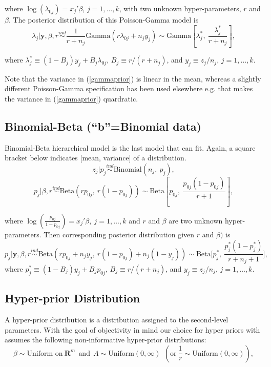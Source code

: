 \documentclass[article]{jss}
\begin{document}
where $\log(\lambda_{0j}) =x_{j}'\beta$, $j=1, \ldots, k$, with two unknown hyper-parameters, $r$ and $\beta$. The posterior distribution of this Poisson-Gamma model is
\begin{equation} \label{gammapost}
\lambda_{j}\vert \textbf{y}, \beta, r \stackrel{ind}{\sim}\frac{1}{r + n_{j}}\textrm{Gamma}(r\lambda_{0j} + n_{j}y_{j})\sim\textrm{Gamma} \left[\lambda^{\ast}_{j},~\frac{\lambda^{\ast}_{j}}{r+n_{j}} \right],
\end{equation}

where $\lambda^{\ast}_{j} \equiv (1-B_{j})y_{j} + B_{j}\lambda_{0j}$,  $B_{j}\equiv r / (r+n_{j})$, and $y_{j}\equiv z_{j} / n_{j}$, $j=1, \ldots, k$. 


Note that the variance in (\ref{gammaprior}) is linear in the mean, whereas a slightly different Poisson-Gamma specification \citep{1997} has been used elsewhere e.g. that makes the variance in (\ref{gammaprior}) quardratic.

\subsection[Binomial-Beta]{Binomial-Beta (``b''=Binomial data)}
Binomial-Beta hierarchical model is the last model that  can fit. Again, a square bracket below indicates [mean, variance] of a distribution.
\begin{equation}
z_{j} \vert p_{j}\stackrel{ind}{\sim}\textrm{Binomial}(n_{j}, ~p_{j}),
\end{equation}
\begin{equation}
p_{j} \vert \beta, r\stackrel{ind}{\sim}\textrm{Beta}(rp_{0j},~ r(1-p_{0j}))\sim \textrm{Beta} \left[p_{0j}, ~\frac{p_{0j}(1-p_{0j})}{r + 1} \right],
\end{equation}

where $\log(\frac{p_{0j}}{1-p_{0j}}) =x_{j}'\beta, ~j=1, \ldots, k$ and $r$ and $\beta$ are two unknown hyper-parameters. Then corresponding posterior distribution given  $r$ and $\beta)$ is
\begin{equation} \label{betapost}
p_{j}\vert \textbf{y}, \beta, r \stackrel{ind}{\sim}\textrm{Beta}(rp_{0j}+n_{j}y_{j},~r(1-p_{0j})+n_{j}(1-y_{j}))\sim\textrm{Beta}\bigg[p^{\ast}_{j},~ \frac{p^{\ast}_{j}(1-p^{\ast}_{j})}{r+n_{j}+1}\bigg],
\end{equation}
where $p^{\ast}_{j}\equiv(1-B_{j})y_{j}+B_{j}p_{0j}$, $B_{j}\equiv r/ (r+n_{j})$, and $y_{j}\equiv z_{j} / n_{j}$, $j=1,\ldots,k$.


\subsection[Hyper-prior Distribution]{Hyper-prior Distribution}
A hyper-prior distribution is a distribution assigned to the second-level parameters. With the goal of objectivity in mind our choice for hyper priors with  assumes the following non-informative hyper-prior distributions:
\begin{equation}
\beta \sim \textrm{Uniform on}~ \mathbf{R}^{m}~~\textrm{and}~~A \sim \textrm{Uniform}(0, \infty) ~~(\textrm{or} ~\frac{1}{r}\sim \textrm{Uniform}(0, \infty)),
\end{equation}
\end{document}
